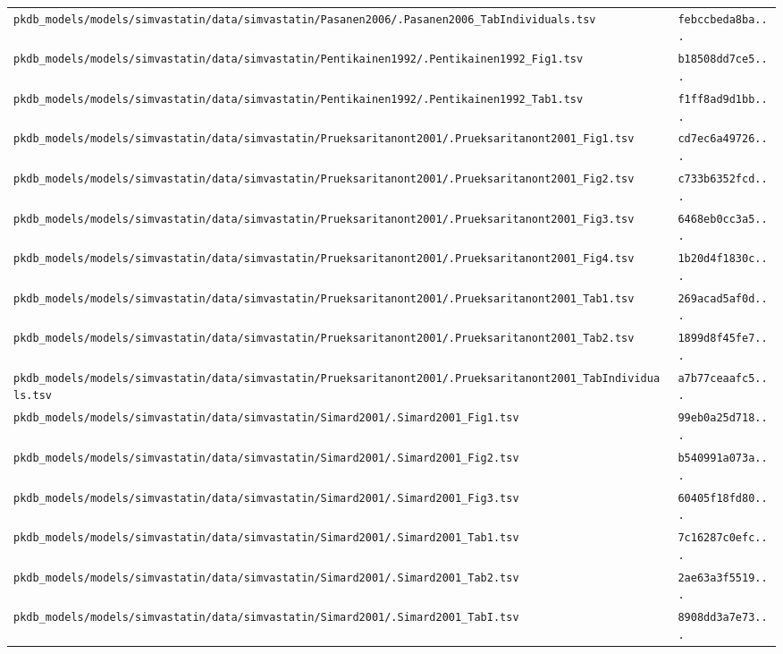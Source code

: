 \documentclass{article}
\begin{document}
\begin{longtable}{ll}
\texttt{pkdb\_models/models/simvastatin/data/simvastatin/Pasanen2006/.Pasanen2006\_TabIndividuals.tsv} & \texttt{febccbeda8ba...} \\
\texttt{pkdb\_models/models/simvastatin/data/simvastatin/Pentikainen1992/.Pentikainen1992\_Fig1.tsv} & \texttt{b18508dd7ce5...} \\
\texttt{pkdb\_models/models/simvastatin/data/simvastatin/Pentikainen1992/.Pentikainen1992\_Tab1.tsv} & \texttt{f1ff8ad9d1bb...} \\
\texttt{pkdb\_models/models/simvastatin/data/simvastatin/Prueksaritanont2001/.Prueksaritanont2001\_Fig1.tsv} & \texttt{cd7ec6a49726...} \\
\texttt{pkdb\_models/models/simvastatin/data/simvastatin/Prueksaritanont2001/.Prueksaritanont2001\_Fig2.tsv} & \texttt{c733b6352fcd...} \\
\texttt{pkdb\_models/models/simvastatin/data/simvastatin/Prueksaritanont2001/.Prueksaritanont2001\_Fig3.tsv} & \texttt{6468eb0cc3a5...} \\
\texttt{pkdb\_models/models/simvastatin/data/simvastatin/Prueksaritanont2001/.Prueksaritanont2001\_Fig4.tsv} & \texttt{1b20d4f1830c...} \\
\texttt{pkdb\_models/models/simvastatin/data/simvastatin/Prueksaritanont2001/.Prueksaritanont2001\_Tab1.tsv} & \texttt{269acad5af0d...} \\
\texttt{pkdb\_models/models/simvastatin/data/simvastatin/Prueksaritanont2001/.Prueksaritanont2001\_Tab2.tsv} & \texttt{1899d8f45fe7...} \\
\texttt{pkdb\_models/models/simvastatin/data/simvastatin/Prueksaritanont2001/.Prueksaritanont2001\_TabIndividuals.tsv} & \texttt{a7b77ceaafc5...} \\
\texttt{pkdb\_models/models/simvastatin/data/simvastatin/Simard2001/.Simard2001\_Fig1.tsv} & \texttt{99eb0a25d718...} \\
\texttt{pkdb\_models/models/simvastatin/data/simvastatin/Simard2001/.Simard2001\_Fig2.tsv} & \texttt{b540991a073a...} \\
\texttt{pkdb\_models/models/simvastatin/data/simvastatin/Simard2001/.Simard2001\_Fig3.tsv} & \texttt{60405f18fd80...} \\
\texttt{pkdb\_models/models/simvastatin/data/simvastatin/Simard2001/.Simard2001\_Tab1.tsv} & \texttt{7c16287c0efc...} \\
\texttt{pkdb\_models/models/simvastatin/data/simvastatin/Simard2001/.Simard2001\_Tab2.tsv} & \texttt{2ae63a3f5519...} \\
\texttt{pkdb\_models/models/simvastatin/data/simvastatin/Simard2001/.Simard2001\_TabI.tsv} & \texttt{8908dd3a7e73...} \\

\end{longtable}
\end{document}
